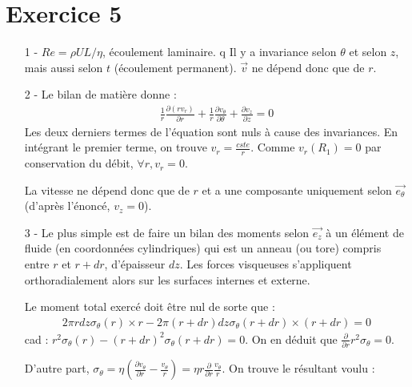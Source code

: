 \documentclass{report}
\begin{document}
\newpage

\section*{Exercice 5}

\begin{itemize}

\item[1 - ] $Re=\rho UL/\eta$, écoulement laminaire. q Il y a invariance selon $\theta$ et selon $z$, mais aussi selon $t$ (écoulement permanent). $\vec{v}$ ne dépend donc que de $r$. 
\item[2 - ] Le bilan de matière donne : 
\begin{align*}
	\frac{1}{r}\frac{\partial(rv_r)}{\partial r} + \frac{1}{r}\frac{\partial v_\theta}{\partial \theta}+\frac{\partial v_z}{\partial z}=0
\end{align*}
Les deux derniers termes de l'équation sont nuls à cause des invariances. En intégrant le premier terme, on trouve $v_r=\frac{cste}{r}$. Comme $v_r(R_1)=0$ par conservation du débit, $\forall r, v_r=0$.

La vitesse ne dépend donc que de $r$ et a une composante uniquement selon $\vec{e_\theta}$ (d'après l'énoncé, $v_z=0$).

\item[3 - ] Le plus simple est de faire un bilan des moments selon $\vec{e_z}$ à un élément de fluide (en coordonnées cylindriques) qui est un anneau (ou tore) compris entre $r$ et $r+dr$, d'épaisseur $dz$. Les forces visqueuses s'appliquent orthoradialement alors sur les surfaces internes et externe. 

Le moment total exercé doit être nul de sorte que : 
\begin{align*}
	2\pi r dz \sigma_\theta(r)\times r - 2\pi (r+dr) dz \sigma_\theta(r+dr)\times (r+dr) = 0
\end{align*}
cad : $r^2 \sigma_\theta(r) - (r+dr)^2 \sigma_\theta(r+dr) = 0$. On en déduit que $\frac{\partial}{\partial r}r^2\sigma_\theta=0$.

D'autre part, $\sigma_\theta=\eta\left(\frac{\partial v_\theta}{\partial r}-\frac{v_\theta}{r}\right) =\eta r \frac{\partial}{\partial r}\frac{v_\theta}{r} $. On trouve le résultant voulu :

\noindent{}
	

\end{itemize}
\end{document}

